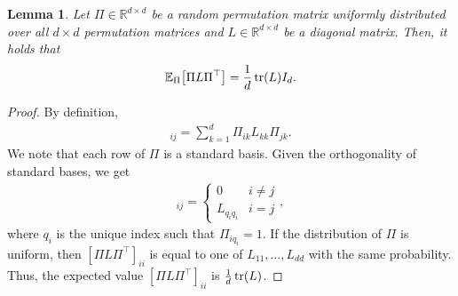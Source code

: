 \documentclass{article}
\newcommand{\R}{\mathbb{R}}
\newcommand{\E}{\mathbb{E}}
\newtheorem{lemma}{Lemma}[subsection]%
\begin{document}
\begin{lemma}
\label{lemma: permutation diagonal}
    Let $\Pi \in \R^{d\times d}$ be a random permutation matrix uniformly distributed over all $d\times d$ permutation matrices and $L\in\R^{d\times d}$ be a diagonal matrix.
    Then, it holds that
    \begin{align}
        \E_\Pi\qty[\Pi L \Pi^\top] = \frac{1}{d}\tr(L)I_d.
    \end{align}
\end{lemma}
\begin{proof}
    By definition, 
    \begin{align}
        [\Pi L \Pi^\top]_{ij} = \sum_{k=1}^d \Pi_{ik} L_{kk} \Pi_{jk}.
    \end{align} 
We note that each row of $\Pi$ is a standard basis. 
Given the orthogonality of standard bases, we get 
\begin{align}
    [\Pi L \Pi^\top]_{ij} = \begin{cases}
        0 & i\neq j \\ 
        L_{q_i q_i}  & i=j
    \end{cases},
\end{align}
where $q_i$ is the unique index such that $\Pi_{iq_i} = 1$. 
If the distribution of $\Pi$ is uniform, then $[\Pi L \Pi^\top]_{ii}$ is equal to one of $L_{11},\dots, L_{dd}$ with the same probability. 
Thus, the expected value  $[\Pi L \Pi^\top]_{ii}$ is $\frac{1}{d} \tr(L)$.
\end{proof}
  
\end{document}
